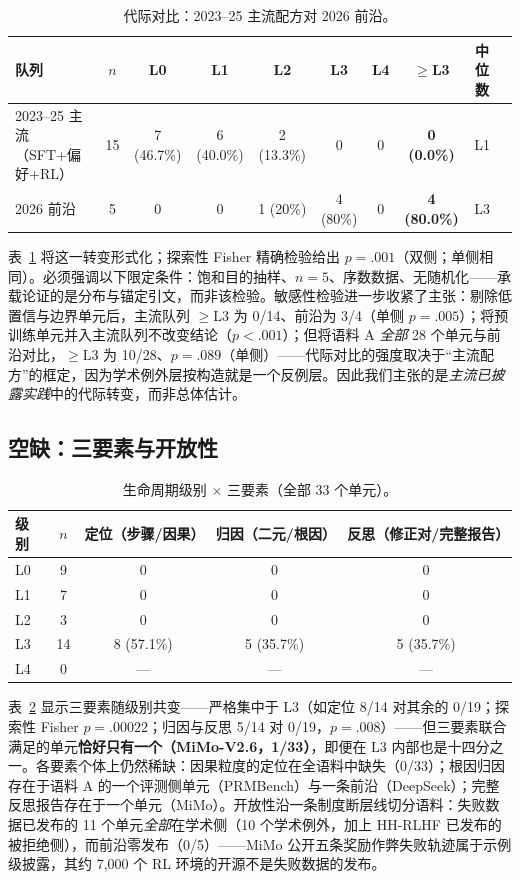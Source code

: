 \documentclass[10pt,fontset=fandol]{ctexart}
\begin{document}
\begin{table}[t]
\centering
\caption{代际对比：2023--25 主流配方对 2026 前沿。}
\label{tab:generations}
\small
\begin{tabular}{lccccccccc}
\toprule
队列 & $n$ & L0 & L1 & L2 & L3 & L4 & $\ge$L3 & 中位数 \\
\midrule
2023--25 主流（SFT+偏好+RL） & 15 & 7 (46.7\%) & 6 (40.0\%) & 2 (13.3\%) & 0 & 0 & \textbf{0 (0.0\%)} & L1 \\
2026 前沿 & 5 & 0 & 0 & 1 (20\%) & 4 (80\%) & 0 & \textbf{4 (80.0\%)} & L3 \\
\bottomrule
\end{tabular}
\end{table}

表~\ref{tab:generations} 将这一转变形式化；探索性 Fisher 精确检验给出 $p = .001$（双侧；单侧相同）。必须强调以下限定条件：饱和目的抽样、$n = 5$、序数数据、无随机化——承载论证的是分布与锚定引文，而非该检验。敏感性检验进一步收紧了主张：剔除低置信与边界单元后，主流队列 $\ge$L3 为 0/14、前沿为 3/4（单侧 $p = .005$）；将预训练单元并入主流队列不改变结论（$p < .001$）；但将语料 A \emph{全部} 28 个单元与前沿对比，$\ge$L3 为 10/28、$p = .089$（单侧）——代际对比的强度取决于“主流配方”的框定，因为学术例外层按构造就是一个反例层。因此我们主张的是\emph{主流已披露实践}中的代际转变，而非总体估计。

\subsection{空缺：三要素与开放性}

\begin{table}[t]
\centering
\caption{生命周期级别 $\times$ 三要素（全部 33 个单元）。}
\label{tab:elements}
\small
\begin{tabular}{lcccc}
\toprule
级别 & $n$ & 定位（步骤/因果） & 归因（二元/根因） & 反思（修正对/完整报告） \\
\midrule
L0 & 9 & 0 & 0 & 0 \\
L1 & 7 & 0 & 0 & 0 \\
L2 & 3 & 0 & 0 & 0 \\
L3 & 14 & 8 (57.1\%) & 5 (35.7\%) & 5 (35.7\%) \\
L4 & 0 & --- & --- & --- \\
\bottomrule
\end{tabular}
\end{table}

表~\ref{tab:elements} 显示三要素随级别共变——严格集中于 L3（如定位 8/14 对其余的 0/19；探索性 Fisher $p = .00022$；归因与反思 5/14 对 0/19，$p = .008$）——但三要素联合满足的单元\textbf{恰好只有一个（MiMo-V2.6，1/33）}，即便在 L3 内部也是十四分之一。各要素个体上仍然稀缺：因果粒度的定位在全语料中缺失（0/33）；根因归因存在于语料 A 的一个评测侧单元（PRMBench）与一条前沿（DeepSeek）；完整反思报告存在于一个单元（MiMo）。开放性沿一条制度断层线切分语料：失败数据已发布的 11 个单元\emph{全部}在学术侧（10 个学术例外，加上 HH-RLHF 已发布的被拒绝侧），而前沿零发布（0/5）——MiMo 公开五条奖励作弊失败轨迹属于示例级披露，其约 7,000 个 RL 环境的开源不是失败数据的发布。
\end{document}
